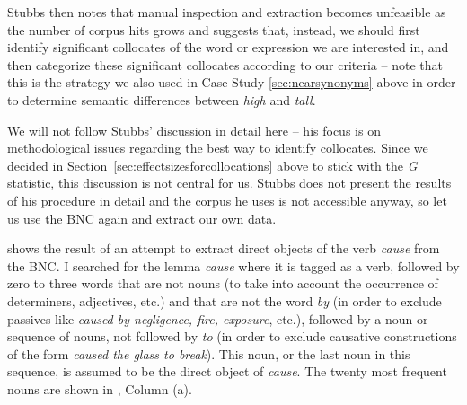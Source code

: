 Stubbs then notes that manual  inspection and extraction  becomes unfeasible as the number of corpus hits  grows and suggests that, instead, we should first identify significant collocates  of the word or expression we are interested in, and then categorize  these significant collocates according to our criteria -- note that this is the strategy we also used in Case Study \ref{sec:nearsynonyms} above in order to determine semantic differences between \textit{high} and \textit{tall}.

We will not follow Stubbs' discussion in detail here -- his focus is on methodological issues regarding the best way to identify collocates.  Since we decided in Section~\ref{sec:effectsizesforcollocations} above to stick with the \emph{G} statistic,  this discussion is not central for us. Stubbs does not present the results of his procedure in detail and the corpus he uses is not accessible anyway, so let us use the BNC  again and extract our own data.

 shows the result of an attempt to extract  direct objects of the verb  \textit{cause} from the BNC.  I searched for the lemma  \textit{cause} where it is tagged  as a verb, followed by zero to three words that are not nouns  (to take into account the occurrence of determiners, adjectives,  etc.) and that are not the word \textit{by} (in order to exclude passives  like \textit{caused by negligence, fire, exposure}, etc.), followed by a noun or sequence of nouns, not followed by \textit{to} (in order to exclude causative constructions of the form \textit{caused the glass to break}). This noun, or the last noun in this sequence, is assumed to be the direct object of \textit{cause}. The twenty most frequent nouns are shown in , Column (a).

